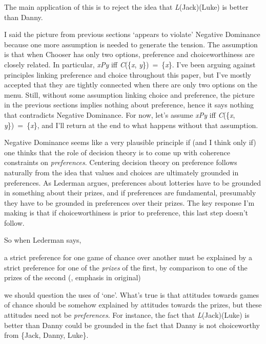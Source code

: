 \documentclass[
  10.5pt,
  twoside]{article}
\renewenvironment{quote}
  {\vskip 5pt%
   \list{}{
    \setlength{\listparindent}{.25in}
    \setlength{\leftmargin}{.25in}
    \setlength{\rightmargin}{\leftmargin}
    \setlength{\parsep}{0in plus 0in minus 0in}
    }
    \item\relax
    \let\item\relax}
  {\endlist\vskip 5pt}
\begin{document}
The main application of this is to reject the idea that
\emph{L}(Jack)(Luke) is better than Danny.

I said the picture from previous sections `appears to violate' Negative
Dominance because one more assumption is needed to generate the tension.
The assumption is that when Chooser has only two options, preference and
choiceworthiness are closely related. In particular, \emph{xPy} iff
\emph{C}(\{\emph{x}, \emph{y}\})~=~\{\emph{x}\}. I've been arguing
against principles linking preference and choice throughout this paper,
but I've mostly accepted that they are tightly connected when there are
only two options on the menu. Still, without some assumption linking
choice and preference, the picture in the previous sections implies
nothing about preference, hence it says nothing that contradicts
Negative Dominance. For now, let's assume \emph{xPy} iff
\emph{C}(\{\emph{x}, \emph{y}\})~=~\{\emph{x}\}, and I'll return at the
end to what happens without that assumption.

Negative Dominance seems like a very plausible principle if (and I think
only if) one thinks that the role of decision theory is to come up with
coherence constraints on \emph{preferences}. Centering decision theory
on preference follows naturally from the idea that values and choices
are ultimately grounded in preferences. As Lederman argues, preferences
about lotteries have to be grounded in something about their prizes, and
if preferences are fundamental, presumably they have to be grounded in
preferences over their prizes. The key response I'm making is that if
choiceworthiness is prior to preference, this last step doesn't follow.

So when Lederman says,

\begin{quote}
a strict preference for one game of chance over another must be
explained by a strict preference for one of the \emph{prizes} of the
first, by comparison to one of the prizes of the second
(, emphasis in
original)
\end{quote}

we should question the uses of `one'. What's true is that attitudes
towards games of chance should be somehow explained by attitudes towards
the prizes, but these attitudes need not be \emph{preferences}. For
instance, the fact that \emph{L}(Jack)(Luke) is better than Danny could
be grounded in the fact that Danny is not choiceworthy from \{Jack,
Danny, Luke\}.
\end{document}
